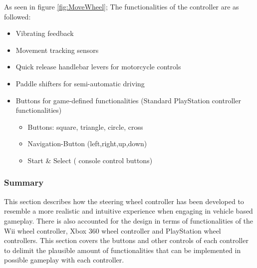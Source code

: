 As seen in figure \ref{fig:MoveWheel}; The functionalities of the controller are as followed:

\begin{itemize}
\item Vibrating feedback
\item Movement tracking sensors
\item Quick release handlebar levers for motorcycle controls
\item Paddle shifters for semi-automatic driving
\item Buttons for game-defined functionalities (Standard PlayStation controller functionalities)
	\begin{itemize}
	\item Buttons: square, triangle, circle, cross
	\item Navigation-Button (left,right,up,down)
	\item Start \& Select ( console control buttons)
	\end{itemize}
\end{itemize}

\subsubsection*{Summary}
This section describes how the steering wheel controller has been developed to resemble a more realistic and intuitive experience when engaging in vehicle based gameplay. There is also accounted for the design in terms of functionalities of the Wii wheel controller, Xbox 360 wheel controller and PlayStation wheel controllers. This section covers the buttons and other controls of each controller to delimit the plausible amount of functionalities that can be implemented in possible gameplay with each controller.